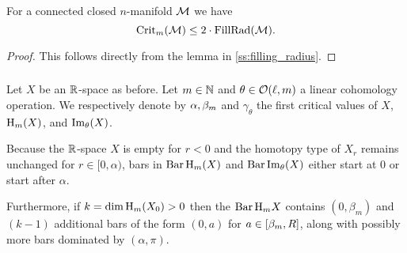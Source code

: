 \subsubsection{}\label{l:crit_val and fill_rad 1}

\lemma For a connected closed $n$-manifold $\mathcal{M}$ we have
\[
\operatorname{Crit}_m(\mathcal{M}) \leq 2 \cdot \operatorname{FillRad}(\mathcal{M}).
\]

\begin{proof}
	This follows directly from the lemma in \cref{ss:filling_radius}. 
\end{proof}


\subsubsection{}\label{subsub:barcode_general}

Let $X$ be an $\mathbb{R}$-space as before.
Let \(m \in \mathbb{N}\) and \(\theta \in \mathcal{O}(\ell,m)\) a linear cohomology operation.
We respectively denote by $\alpha, \beta_m$ and $\gamma_\theta$ the first critical values of $X$, \(\mathrm{H}_m(X)\), and \(\operatorname{Im}_\theta(X)\).

Because the $\mathbb{R}$-space $X$ is empty for \(r < 0\) and the homotopy type of $X_r$ remains unchanged for $r \in [0, \alpha)$, bars in \(\operatorname{Bar} \mathrm{H}_m(X)\) and $\operatorname{Bar}\operatorname{Im}_\theta(X)$ either start at $0$ or start after $\alpha$.

Furthermore, if \(k = \dim \operatorname{H}_m(X_0) > 0\) then the $\operatorname{Bar}\mathrm{H}_m X$ contains $(0,\beta_m)$ and \((k - 1)\) additional bars of the form \((0, a)\) for \(a \in [\beta_m, R]\), along with possibly more bars dominated by \((\alpha, \pi)\).


